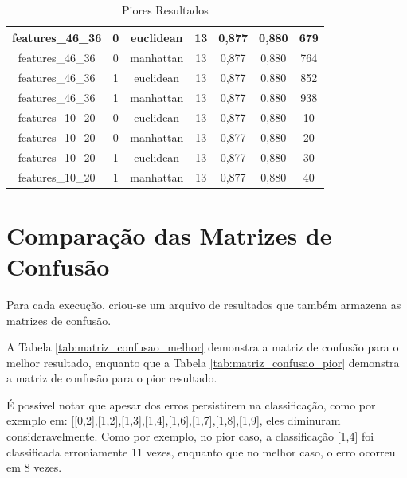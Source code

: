 \documentclass[12pt]{article}
\begin{document}
\begin{table}[!htb]
\begin{tabular}{|c|c|c|c|c|c|c|}
  features\_46\_36    & 0                   & euclidean         & 13         & 0,877             & 0,880            & 679                     \\ \hline
  features\_46\_36    & 0                   & manhattan         & 13         & 0,877             & 0,880            & 764                     \\ \hline
  features\_46\_36    & 1                   & euclidean         & 13         & 0,877             & 0,880            & 852                     \\ \hline
  features\_46\_36    & 1                   & manhattan         & 13         & 0,877             & 0,880            & 938                     \\ \hline
  features\_10\_20    & 0                   & euclidean         & 13         & 0,877             & 0,880            & 10                      \\ \hline
  features\_10\_20    & 0                   & manhattan         & 13         & 0,877             & 0,880            & 20                      \\ \hline
  features\_10\_20    & 1                   & euclidean         & 13         & 0,877             & 0,880            & 30                      \\ \hline
  features\_10\_20    & 1                   & manhattan         & 13         & 0,877             & 0,880            & 40                      \\ \hline
  \end{tabular}
  \caption{Piores Resultados}
  \label{tab:resultados_piores}
\end{table}

\section{Comparação das Matrizes de Confusão}

Para cada execução, criou-se um arquivo de resultados que também armazena as matrizes de confusão.

A Tabela \ref{tab:matriz_confusao_melhor} demonstra a matriz de confusão para o melhor resultado, enquanto que a Tabela \ref{tab:matriz_confusao_pior} demonstra a matriz de confusão para o pior resultado.

É possível notar que apesar dos erros persistirem na classificação, como por exemplo em: [[0,2],[1,2],[1,3],[1,4],[1,6],[1,7],[1,8],[1,9], eles diminuram consideravelmente. Como por exemplo, no pior caso, a classificação [1,4] foi classificada erroniamente 11 vezes, enquanto que no melhor caso, o erro ocorreu em 8 vezes.
\end{document}
